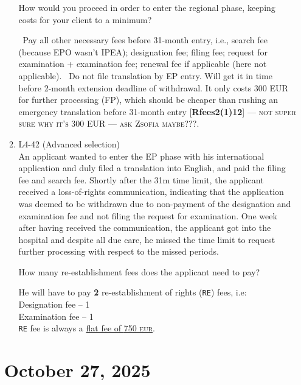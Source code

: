 \documentclass{report}
\newcommand{\s}{\adforn{74} \ }
\begin{document}
\begin{enumerate}[label=\textbf{Answer \arabic*}]
\begin{enumerate}[label=\textbf{Answer \arabic*}]
    \vspace{1em}
    How would you proceed in order to enter the regional phase, keeping costs for your client to a minimum?

        \vspace{1em}
        
     \s Pay all other necessary fees before 31-month entry, i.e., search fee (because EPO wasn't IPEA); designation fee; filing fee; request for examination + examination fee; renewal fee if applicable (here not applicable).
     \s Do not file translation by EP entry. Will get it in time before 2-month extension deadline of withdrawal. It only costs \textsc{300 EUR} for further processing (FP), which should be cheaper than rushing an emergency translation before 31-month entry [\textbf{Rfees2(1)12}] --- \textsc{not super sure why it's 300 EUR --- ask Zsofia maybe???}. 
    \item %
    L4-42 (Advanced selection) \\
    An applicant wanted to enter the EP phase with his international application and duly filed a translation into English, and paid the filing fee and search fee. Shortly after the 31m time limit, the applicant received a loss-of-rights communication, indicating that the application was deemed to be withdrawn due to non-payment of the designation and examination fee and not filing the request for examination. One week after having received the communication, the applicant got into the hospital and despite all due care, he missed the time limit to request further processing with respect to the missed periods. 
    
    \vspace{1em}
    How many re-establishment fees does the applicant need to pay? 

    \vspace{1em}
    
    He will have to pay \textbf{2} re-establishment of rights (\texttt{RE}) fees, i.e:\\
    Designation fee -- 1 \\
    Examination fee -- 1\\
    \texttt{RE} fee is always a \underline{flat fee of \textsc{750 eur}}. 
    
\end{enumerate}
\section{October 27, 2025}



\end{enumerate}
\end{document}

